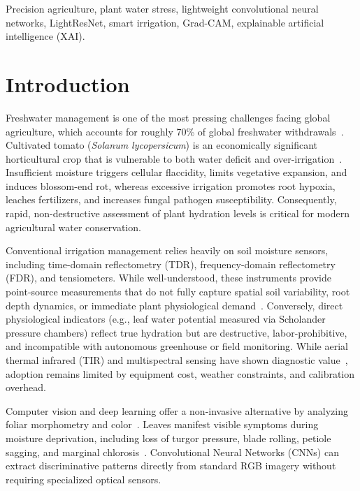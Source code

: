 \documentclass[conference]{IEEEtran}
\begin{document}
\begin{IEEEkeywords}
Precision agriculture, plant water stress, lightweight convolutional neural networks, LightResNet, smart irrigation, Grad-CAM, explainable artificial intelligence (XAI).
\end{IEEEkeywords}

\section{Introduction}
Freshwater management is one of the most pressing challenges facing global agriculture, which accounts for roughly 70\% of global freshwater withdrawals~\cite{fereres2007deficit}. Cultivated tomato (\textit{Solanum lycopersicum}) is an economically significant horticultural crop that is vulnerable to both water deficit and over-irrigation~\cite{jones2004irrigation, katsoulas2016canopy}. Insufficient moisture triggers cellular flaccidity, limits vegetative expansion, and induces blossom-end rot, whereas excessive irrigation promotes root hypoxia, leaches fertilizers, and increases fungal pathogen susceptibility. Consequently, rapid, non-destructive assessment of plant hydration levels is critical for modern agricultural water conservation.

Conventional irrigation management relies heavily on soil moisture sensors, including time-domain reflectometry (TDR), frequency-domain reflectometry (FDR), and tensiometers. While well-understood, these instruments provide point-source measurements that do not fully capture spatial soil variability, root depth dynamics, or immediate plant physiological demand~\cite{jones2004irrigation}. Conversely, direct physiological indicators (e.g., leaf water potential measured via Scholander pressure chambers) reflect true hydration but are destructive, labor-prohibitive, and incompatible with autonomous greenhouse or field monitoring. While aerial thermal infrared (TIR) and multispectral sensing have shown diagnostic value~\cite{osroosh2016comparison, sun2023evaluation}, adoption remains limited by equipment cost, weather constraints, and calibration overhead.

Computer vision and deep learning offer a non-invasive alternative by analyzing foliar morphometry and color~\cite{kamilaris2018deep, mohanty2016using, chandel2021deep}. Leaves manifest visible symptoms during moisture deprivation, including loss of turgor pressure, blade rolling, petiole sagging, and marginal chlorosis~\cite{zhuang2018identification}. Convolutional Neural Networks (CNNs) can extract discriminative patterns directly from standard RGB imagery without requiring specialized optical sensors.
\end{document}
